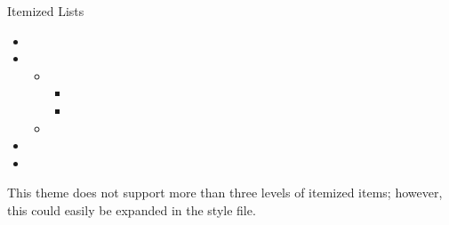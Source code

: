 \documentclass[\string~/GitHub/sthlmNordBeamerTheme/sthlmNordLightDemo.tex]{subfiles}
\begin{document}
\begin{frame}[fragile]{Itemized Lists}
	\begin{itemize}
		\item \lipsum[1][1]
		\item \lipsum[1][2]
		      \begin{itemize}
			      \item \lipsum[2][1]
			            \begin{itemize}
				            \item \lipsum[3][1]
				            \item \lipsum[1][2]
			            \end{itemize}
			      \item \lipsum[2][2]
		      \end{itemize}
		\item \lipsum[1][3]
		\item \lipsum[1][4]
	\end{itemize}

	\remarks This theme does not support more than three levels of itemized
	items; however, this could easily be expanded in the style file.

\end{frame}
\end{document}
